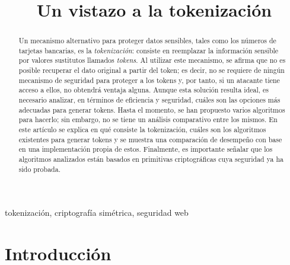 \documentclass[conference]{IEEEtran}
\begin{document}
  \title{Un vistazo a la tokenización}

  \author{%
    }

  \maketitle

  \begin{abstract}
     Un mecanismo alternativo para proteger datos sensibles, tales como los
     números de tarjetas bancarias, es la {\em tokenización}: consiste en
     reemplazar la información sensible por valores sustitutos llamados {\em
     tokens}. Al utilizar este mecanismo, se afirma que no es posible recuperar
     el dato original a partir del token; es decir, no se requiere de ningún
     mecanismo de seguridad para proteger a los tokens y, por tanto,  si un
     atacante tiene acceso a ellos, no obtendrá  ventaja alguna. Aunque esta
     solución resulta ideal, es necesario analizar, en términos de eficiencia y
     seguridad, cuáles son las opciones más adecuadas para generar tokens. Hasta
     el momento, se han propuesto varios algoritmos para hacerlo; sin embargo,
     no se tiene un análisis comparativo entre los mismos. En este artículo se
     explica en qué consiste la tokenización, cuáles son los algoritmos
     existentes para generar tokens y se muestra una comparación de desempeño
     con base en una implementación propia de estos. Finalmente, es importante
     señalar que los algoritmos analizados están basados en primitivas
     criptográficas cuya seguridad ya ha sido probada.
  \end{abstract}

  \begin{IEEEkeywords}
    tokenización, criptografía simétrica, seguridad web
  \end{IEEEkeywords}

  \section{Introducción}
\end{document}
